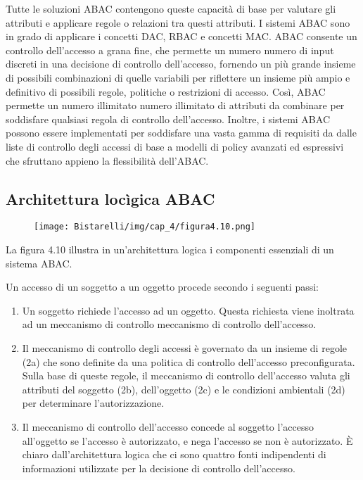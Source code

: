 \singlespacing

Tutte le soluzioni ABAC contengono queste capacità di base per valutare gli attributi e applicare regole o relazioni tra questi attributi. I sistemi ABAC sono in grado di applicare i concetti DAC, RBAC e concetti MAC. ABAC consente un controllo dell'accesso a grana fine, che permette un numero numero di input discreti in una decisione di controllo dell'accesso, fornendo un più grande insieme di possibili combinazioni di quelle variabili per riflettere un insieme più ampio e definitivo di possibili regole, politiche o restrizioni di accesso. Così, ABAC permette un numero illimitato numero illimitato di attributi da combinare per soddisfare qualsiasi regola di controllo dell'accesso. Inoltre, i sistemi ABAC possono essere implementati per soddisfare una vasta gamma di requisiti da dalle liste di controllo degli accessi di base a modelli di policy avanzati ed espressivi che sfruttano appieno la flessibilità dell'ABAC.
\newpage
\subsection{Architettura locìgica ABAC}
\begin{figure}[H]
	\centering
    \texttt{[image: Bistarelli/img/cap\_4/figura4.10.png]}
\end{figure}

La figura 4.10 illustra in un'architettura logica i componenti essenziali di un sistema ABAC.

\singlespacing

Un accesso di un soggetto a un oggetto procede secondo i seguenti passi:

\begin{enumerate}

    \item Un soggetto richiede l'accesso ad un oggetto. Questa richiesta viene inoltrata ad un meccanismo di controllo meccanismo di controllo dell'accesso.
    
    \item Il meccanismo di controllo degli accessi è governato da un insieme di regole (2a) che sono definite da una politica di controllo dell'accesso preconfigurata. Sulla base di queste regole, il meccanismo di controllo dell'accesso valuta gli attributi del soggetto (2b), dell'oggetto (2c) e le condizioni ambientali (2d) per determinare l'autorizzazione.
    
    \item Il meccanismo di controllo dell'accesso concede al soggetto l'accesso all'oggetto se l'accesso è autorizzato, e nega l'accesso se non è autorizzato. È chiaro dall'architettura logica che ci sono quattro fonti indipendenti di informazioni utilizzate per la decisione di controllo dell'accesso.

\end{enumerate}

